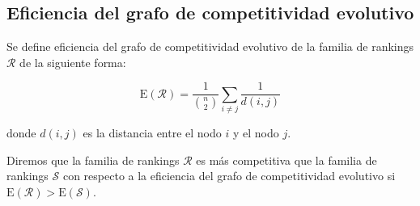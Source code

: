\subsection*{Eficiencia del grafo de competitividad evolutivo}

\begin{defi}
Se define eficiencia del grafo de competitividad evolutivo de la familia de rankings $\mathcal{R}$ de la siguiente forma:

\begin{equation}
\mathrm{E}(\mathcal{R}) = \dfrac{1}{\binom{n}{2}} \sum_{i\neq j} \dfrac{1}{d(i,j)}
\end{equation}

donde $d(i,j)$ es la distancia entre el nodo $i$ y el nodo $j$.
\end{defi}

\begin{defi}
Diremos que la familia de rankings $\mathcal{R}$ es más competitiva que la familia de rankings $\mathcal{S}$ con respecto a la eficiencia del grafo de competitividad evolutivo si $\mathrm{E}(\mathcal{R}) > \mathrm{E}(\mathcal{S})$.
\end{defi}

